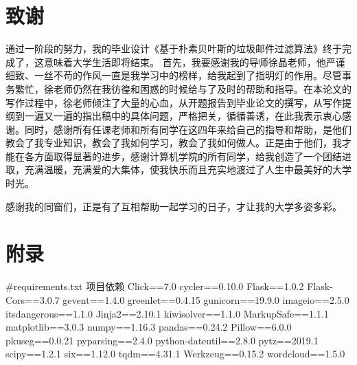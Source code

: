 \documentclass[UTF8,zihao=-4]{ctexart}
\begin{document}
\section*{致谢}
	通过一阶段的努力，我的毕业设计《基于朴素贝叶斯的垃圾邮件过滤算法》终于完成了，这意味着大学生活即将结束。
	首先，我要感谢我的导师徐晶老师，他严谨细致、一丝不苟的作风一直是我学习中的榜样，给我起到了指明灯的作用。尽管事务繁忙，徐老师仍然在我彷徨和困惑的时候给与了及时的帮助和指导。在本论文的写作过程中，徐老师倾注了大量的心血，从开题报告到毕业论文的撰写，从写作提纲到一遍又一遍的指出稿中的具体问题，严格把关，循循善诱，在此我表示衷心感谢。同时，感谢所有任课老师和所有同学在这四年来给自己的指导和帮助，是他们教会了我专业知识，教会了我如何学习，教会了我如何做人。正是由于他们，我才能在各方面取得显著的进步，感谢计算机学院的所有同学，给我创造了一个团结进取，充满温暖，充满爱的大集体，使我快乐而且充实地渡过了人生中最美好的大学时光。
	
	感谢我的同窗们，正是有了互相帮助一起学习的日子，才让我的大学多姿多彩。

\appendix
\section{附录}
\begin{python}
#requirements.txt 项目依赖
Click==7.0
cycler==0.10.0
Flask==1.0.2
Flask-Cors==3.0.7
gevent==1.4.0
greenlet==0.4.15
gunicorn==19.9.0
imageio==2.5.0
itsdangerous==1.1.0
Jinja2==2.10.1
kiwisolver==1.1.0
MarkupSafe==1.1.1
matplotlib==3.0.3
numpy==1.16.3
pandas==0.24.2
Pillow==6.0.0
pkuseg==0.0.21
pyparsing==2.4.0
python-dateutil==2.8.0
pytz==2019.1
scipy==1.2.1
six==1.12.0
tqdm==4.31.1
Werkzeug==0.15.2
wordcloud==1.5.0
\end{python}
\end{document}
